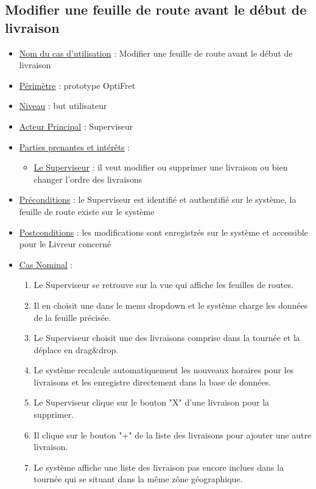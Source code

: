 \documentclass[a4paper]{report}
\begin{document}
\subsection{Modifier une feuille de route avant le début de livraison}
\begin{itemize}[label = \textbullet, font = \color{orange}]
\item \underline{Nom du cas d'utilisation} : Modifier une feuille de route avant le début de livraison
\item \underline{Périmètre} : prototype OptiFret
\item \underline{Niveau} : but utilisateur
\item \underline{Acteur Principal} : Superviseur
\item \underline{Parties prenantes et intérêts} :
	\begin{itemize}[label = \textbullet, font = \color{blue}]
    \item \underline{Le Superviseur} : il veut modifier ou supprimer une livraison ou bien changer l'ordre des livraisons
    \end{itemize}
\item \underline{Préconditions} : le Superviseur est identifié et authentifié sur le système, la feuille de route existe sur le système
\item \underline{Postconditions} : les modifications sont enregistrés sur le système et accessible pour le Livreur concerné
\item \underline{Cas Nominal} :
	\begin{enumerate}
        \item Le Superviseur se retrouve sur la vue qui affiche les feuilles de routes.
        \item Il en choisit une dans le menu dropdown et le système charge les données de la feuille précisée.
        \item Le Superviseur choisit une des livraisons comprise dans la tournée et la déplace en drag\&drop.
        \item Le système recalcule automatiquement les nouveaux horaires pour les livraisons et les enregistre directement dans la base de données.
        \item Le Superviseur clique sur le bouton "X" d'une livraison pour la supprimer.
        \item Il clique sur le bouton "+" de la liste des livraisons pour ajouter une autre livraison.
        \item Le système affiche une liste des livraison pas encore inclues dans la tournée qui se situant dans la même zône géographique.

\end{enumerate}
\end{itemize}
\end{document}
